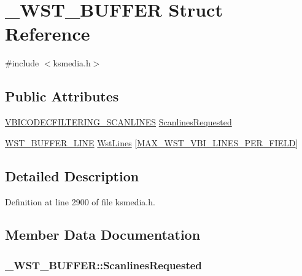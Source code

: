 \hypertarget{struct___w_s_t___b_u_f_f_e_r}{}\section{\+\_\+\+W\+S\+T\+\_\+\+B\+U\+F\+F\+ER Struct Reference}
\label{struct___w_s_t___b_u_f_f_e_r}


{\ttfamily \#include $<$ksmedia.\+h$>$}

\subsection*{Public Attributes}
\begin{DoxyCompactItemize}
\item 
\hyperlink{ksmedia_8h_adc03ca4cc884d2dd2dcec672584d8a42}{V\+B\+I\+C\+O\+D\+E\+C\+F\+I\+L\+T\+E\+R\+I\+N\+G\+\_\+\+S\+C\+A\+N\+L\+I\+N\+ES} \hyperlink{struct___w_s_t___b_u_f_f_e_r_a5d9d3a05deaa5070ff48399a0ab4640c}{Scanlines\+Requested}
\item 
\hyperlink{ksmedia_8h_a7829671b9b5d428426ca8191ade2e9e7}{W\+S\+T\+\_\+\+B\+U\+F\+F\+E\+R\+\_\+\+L\+I\+NE} \hyperlink{struct___w_s_t___b_u_f_f_e_r_a04171f685d65cb8f56d5c7f714b7372f}{Wst\+Lines} \mbox{[}\hyperlink{ksmedia_8h_a6522312249ea3102453cd64d691dd237}{M\+A\+X\+\_\+\+W\+S\+T\+\_\+\+V\+B\+I\+\_\+\+L\+I\+N\+E\+S\+\_\+\+P\+E\+R\+\_\+\+F\+I\+E\+LD}\mbox{]}
\end{DoxyCompactItemize}


\subsection{Detailed Description}


Definition at line 2900 of file ksmedia.\+h.



\subsection{Member Data Documentation}
\subsubsection[{\texorpdfstring{Scanlines\+Requested}{ScanlinesRequested}}]{ \+\_\+\+W\+S\+T\+\_\+\+B\+U\+F\+F\+E\+R\+::\+Scanlines\+Requested}\hypertarget{struct___w_s_t___b_u_f_f_e_r_a5d9d3a05deaa5070ff48399a0ab4640c}{}\label{struct___w_s_t___b_u_f_f_e_r_a5d9d3a05deaa5070ff48399a0ab4640c}


